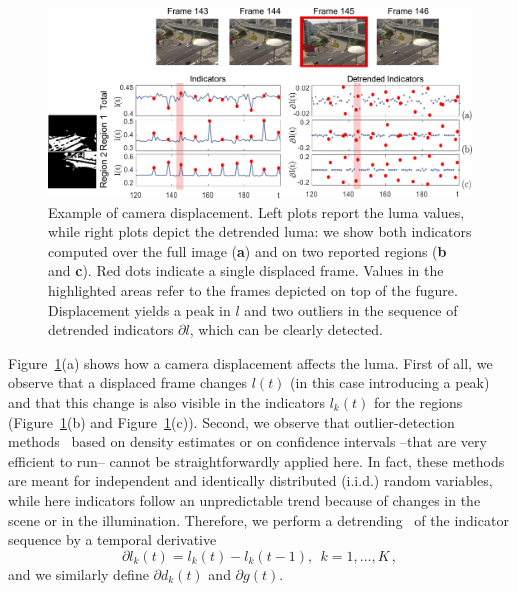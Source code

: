 \documentclass{llncs}
\begin{document}
\begin{figure}[tb]
\centering
\includegraphics[width=1\linewidth]{Immagini/indicatori}
\caption{Example of camera displacement. 
Left plots report the luma values, while right plots depict the detrended luma: 
we show both indicators computed over the full image (\textbf{a}) and on two reported regions (\textbf{b} and \textbf{c}). Red dots indicate a single displaced frame. Values in the highlighted areas refer to the frames depicted on top of the fugure. 
Displacement yields a peak in $l$ and two outliers in the sequence of detrended indicators $\partial l$, which can be clearly detected. }
\label{fig:indicatori} 
\end{figure}
Figure~\ref{fig:indicatori}(a) shows how a camera displacement affects the luma. First of all, we observe that a displaced frame changes $l(t)$ (in this case introducing a peak) and that this change is also visible in the indicators $l_k(t)$ for the regions (Figure~\ref{fig:indicatori}(b) and Figure~\ref{fig:indicatori}(c)). Second, we observe that outlier-detection methods~\cite{Chandola2009} based on density estimates or on confidence intervals --that are very efficient to run-- cannot be straightforwardly applied here. In fact, these methods are meant for independent and identically distributed (i.i.d.) random variables, while here indicators follow an unpredictable trend because of changes in the scene or in the illumination. Therefore, we perform a detrending~\cite{Gustafsson2000} of the indicator sequence by a temporal derivative
\begin{equation}\label{eq:detrending}
 \partial l_k(t) = l_k(t)-l_k(t-1),  \ \ k = 1, \dots, K\,,
\end{equation}
and we similarly define $\partial d_k(t)$ and $\partial g(t)$. 
\end{document}
